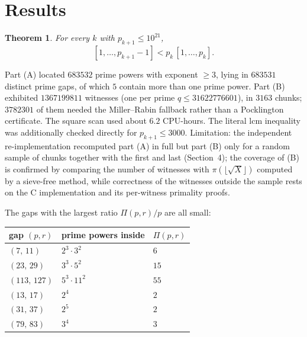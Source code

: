 \documentclass[11pt]{amsart}
\newtheorem{theorem}{Theorem}
\begin{document}
\section{Results}

\begin{theorem}
For every $k$ with $p_{k+1}\le 10^{21}$,
\[[1,\ldots,p_{k+1}-1]<p_k\,[1,\ldots,p_k].\]
\end{theorem}

Part (A) located $683532$ prime powers with exponent $\ge3$, lying in
$683531$ distinct prime gaps, of which $5$ contain more than one prime
power. Part (B) exhibited $1367199811$ witnesses (one per prime $q\le 31622776601$),
in $3163$ chunks; $3782301$ of them needed the Miller--Rabin fallback
rather than a Pocklington certificate. The square scan used about
$6.2$ CPU-hours. The literal lcm inequality was additionally checked
directly for $p_{k+1}\le 3000$.
Limitation: the independent re-implementation recomputed part (A) in full
but part (B) only for a random sample of chunks together with the first
and last (Section~4); the coverage of (B) is confirmed by comparing the
number of witnesses with $\pi(\lfloor\sqrt X\rfloor)$ computed by a
sieve-free method, while correctness of the witnesses outside the sample
rests on the C implementation and its per-witness primality proofs.

The gaps with the largest ratio $\Pi(p,r)/p$ are all small:
\begin{center}
\begin{tabular}{lll}
gap $(p,r)$ & prime powers inside & $\Pi(p,r)$ \\ \hline
$(7,\,11)$ & $2^{3} \cdot 3^{2}$ & $6$ \\
$(23,\,29)$ & $3^{3} \cdot 5^{2}$ & $15$ \\
$(113,\,127)$ & $5^{3} \cdot 11^{2}$ & $55$ \\
$(13,\,17)$ & $2^{4}$ & $2$ \\
$(31,\,37)$ & $2^{5}$ & $2$ \\
$(79,\,83)$ & $3^{4}$ & $3$ \\
\end{tabular}
\end{center}
\end{document}
